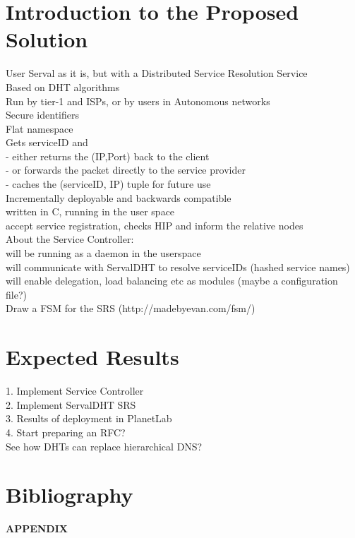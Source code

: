 \documentclass[12pt,a4paper,oneside]{article}
\begin{document}
\newpage
\section{Introduction to the Proposed Solution}
User Serval as it is, but with a Distributed Service Resolution Service
\\Based on DHT algorithms
\\Run by tier-1 and ISPs, or by users in Autonomous networks
\\Secure identifiers
\\Flat namespace
\\Gets serviceID and
\\- either returns the (IP,Port) back to the client
\\- or forwards the packet directly to the service provider
\\- caches the (serviceID, IP) tuple for future use
\\Incrementally deployable and backwards compatible
\\written in C, running in the user space
\\accept service registration, checks HIP and inform the relative nodes
\\About the Service Controller:
\\will be running as a daemon in the userspace
\\will communicate with ServalDHT to resolve serviceIDs (hashed service names)
\\will enable delegation, load balancing etc as modules (maybe a configuration file?)
\\Draw a FSM for the SRS (http://madebyevan.com/fsm/)



\newpage
\section{Expected Results}
1. Implement Service Controller
\\2. Implement ServalDHT SRS
\\3. Results of deployment in PlanetLab
\\4. Start preparing an RFC?
\\See how DHTs can replace hierarchical DNS?


\newpage
\section{Bibliography}
\nocite{*}

\renewcommand{\refname}{}


\newpage
\thispagestyle{empty}
{\Huge \bf APPENDIX}
\newpage
\end{document}
